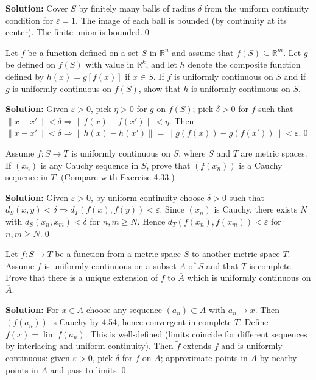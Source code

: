 \noindent\textbf{Solution:}
Cover $S$ by finitely many balls of radius $\delta$ from the uniform continuity condition for $\varepsilon=1$. The image of each ball is bounded (by continuity at its center). The finite union is bounded.\qed



\begin{problembox}
Let $f$ be a function defined on a set $S$ in $\mathbb{R}^n$ and assume that $f(S) \subseteq \mathbb{R}^m$. Let $g$ be defined on $f(S)$ with value in $\mathbb{R}^k$, and let $h$ denote the composite function defined by $h(x) = g[f(x)]$ if $x \in S$. If $f$ is uniformly continuous on $S$ and if $g$ is uniformly continuous on $f(S)$, show that $h$ is uniformly continuous on $S$.
\end{problembox}

\noindent\textbf{Solution:}
Given $\varepsilon>0$, pick $\eta>0$ for $g$ on $f(S)$; pick $\delta>0$ for $f$ such that $\|x-x'\|<\delta\Rightarrow \|f(x)-f(x')\|<\eta$. Then $\|x-x'\|<\delta\Rightarrow \|h(x)-h(x')\|=\|g(f(x))-g(f(x'))\|<\varepsilon$.\qed



\begin{problembox}
Assume $f : S \to T$ is uniformly continuous on $S$, where $S$ and $T$ are metric spaces. If $(x_n)$ is any Cauchy sequence in $S$, prove that $(f(x_n))$ is a Cauchy sequence in $T$. (Compare with Exercise 4.33.)
\end{problembox}

\noindent\textbf{Solution:}
Given $\varepsilon>0$, by uniform continuity choose $\delta>0$ such that $d_S(x,y)<\delta\Rightarrow d_T(f(x),f(y))<\varepsilon$. Since $(x_n)$ is Cauchy, there exists $N$ with $d_S(x_n,x_m)<\delta$ for $n,m\ge N$. Hence $d_T(f(x_n),f(x_m))<\varepsilon$ for $n,m\ge N$.\qed



\begin{problembox}
Let $f : S \to T$ be a function from a metric space $S$ to another metric space $T$. Assume $f$ is uniformly continuous on a subset $A$ of $S$ and that $T$ is complete. Prove that there is a unique extension of $f$ to $\overline{A}$ which is uniformly continuous on $\overline{A}$.
\end{problembox}

\noindent\textbf{Solution:}
For $x\in\overline{A}$ choose any sequence $(a_n)\subset A$ with $a_n\to x$. Then $(f(a_n))$ is Cauchy by 4.54, hence convergent in complete $T$. Define $\tilde f(x)=\lim f(a_n)$. This is well-defined (limits coincide for different sequences by interlacing and uniform continuity). Then $\tilde f$ extends $f$ and is uniformly continuous: given $\varepsilon>0$, pick $\delta$ for $f$ on $A$; approximate points in $\overline{A}$ by nearby points in $A$ and pass to limits.\qed



